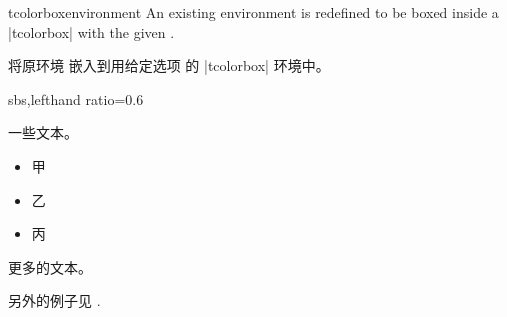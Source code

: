 \begin{docCommand}[doc new=2014-10-20]{tcolorboxenvironment}{}
  An existing environment  is redefined to be boxed inside a
  |tcolorbox| with the given .

将原环境 嵌入到用给定选项  的 |tcolorbox| 环境中。
\begin{dispExample*}{sbs,lefthand ratio=0.6}
\newenvironment{myitemize}{%
  \begin{itemize}}{\end{itemize}}


一些文本。
\begin{myitemize}
\item 甲
\item 乙
\item 丙
\end{myitemize}
更多的文本。
\end{dispExample*}

\medskip
另外的例子见 .
\end{docCommand}

